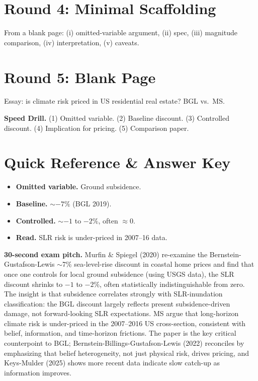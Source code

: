 \documentclass[11pt]{article}
\begin{document}
\section*{Round 4: Minimal Scaffolding}
From a blank page: (i) omitted-variable argument, (ii) spec, (iii) magnitude comparison, (iv) interpretation, (v) caveats.

\section*{Round 5: Blank Page}
Essay: is climate risk priced in US residential real estate? BGL vs.\ MS.

\vspace{6pt}
\begin{drillbox}
\textbf{Speed Drill.} (1) Omitted variable. (2) Baseline discount. (3) Controlled discount. (4) Implication for pricing. (5) Comparison paper.
\end{drillbox}

\section*{Quick Reference \& Answer Key}
\begin{answerbox}
\begin{itemize}
\item \textbf{Omitted variable.} Ground subsidence.
\item \textbf{Baseline.} $\sim$$-7\%$ (BGL 2019).
\item \textbf{Controlled.} $\sim$$-1$ to $-2\%$, often $\approx 0$.
\item \textbf{Read.} SLR risk is under-priced in 2007--16 data.
\end{itemize}
\end{answerbox}

\begin{keybox}
\textbf{30-second exam pitch.} Murfin \& Spiegel (2020) re-examine the Bernstein-Gustafson-Lewis $\sim$7\% sea-level-rise discount in coastal home prices and find that once one controls for local ground subsidence (using USGS data), the SLR discount shrinks to $-1$ to $-2\%$, often statistically indistinguishable from zero. The insight is that subsidence correlates strongly with SLR-inundation classification: the BGL discount largely reflects present subsidence-driven damage, not forward-looking SLR expectations. MS argue that long-horizon climate risk is under-priced in the 2007--2016 US cross-section, consistent with belief, information, and time-horizon frictions. The paper is the key critical counterpoint to BGL; Bernstein-Billings-Gustafson-Lewis (2022) reconciles by emphasizing that belief heterogeneity, not just physical risk, drives pricing, and Keys-Mulder (2025) shows more recent data indicate slow catch-up as information improves.
\end{keybox}
\end{document}
